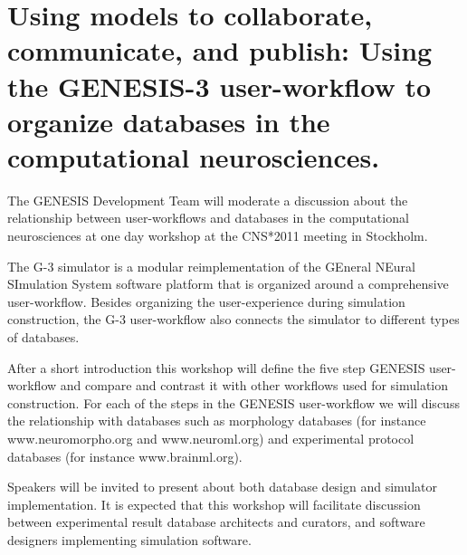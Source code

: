 \documentclass[12pt]{article}
\begin{document}


\section*{Using models to collaborate, communicate, and publish:  Using the GENESIS-3 user-workflow to organize databases in the computational neurosciences.}

The GENESIS Development Team will moderate a discussion about the
relationship between user-workflows and databases in the computational
neurosciences at one day workshop at the CNS*2011 meeting in
Stockholm.

\vspace{3mm}

The G-3 simulator is a modular reimplementation of the GEneral NEural
SImulation System software platform that is organized around a
comprehensive user-workflow.  Besides organizing the user-experience
during simulation construction, the G-3 user-workflow also connects
the simulator to different types of databases.

After a short introduction this workshop will define the five step
GENESIS user-workflow and compare and contrast it with other workflows
used for simulation construction.  For each of the steps in the
GENESIS user-workflow we will discuss the relationship with
databases such as morphology databases (for instance
www.neuromorpho.org and www.neuroml.org) and experimental protocol
databases (for instance www.brainml.org).

Speakers will be invited to present about both database design and
simulator implementation.  It is expected that this workshop will
facilitate discussion between experimental result database architects
and curators, and software designers implementing simulation software.




\end{document}
